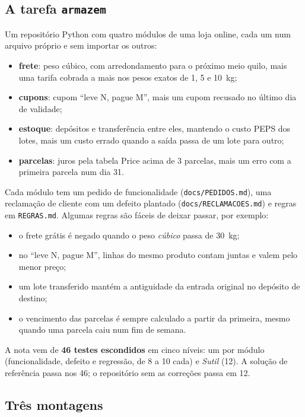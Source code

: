 \documentclass[11pt,a4paper]{article}
\begin{document}
\subsection{A tarefa \texttt{armazem}}

Um repositório Python com quatro módulos de uma loja online, cada um num arquivo próprio e sem
importar os outros:
\begin{itemize}
  \item \textbf{frete}: peso cúbico, com arredondamento para o próximo meio quilo, mais uma tarifa cobrada a mais nos pesos exatos de 1, 5 e 10~kg;
  \item \textbf{cupons}: cupom ``leve N, pague M'', mais um cupom recusado no último dia de validade;
  \item \textbf{estoque}: depósitos e transferência entre eles, mantendo o custo PEPS dos lotes, mais um custo errado quando a saída passa de um lote para outro;
  \item \textbf{parcelas}: juros pela tabela Price acima de 3 parcelas, mais um erro com a primeira parcela num dia 31.
\end{itemize}
Cada módulo tem um pedido de funcionalidade (\texttt{docs/PEDIDOS.md}), uma reclamação de cliente com
um defeito plantado (\texttt{docs/RECLAMACOES.md}) e regras em \texttt{REGRAS.md}. Algumas regras são
fáceis de deixar passar, por exemplo:
\begin{itemize}
  \item o frete grátis é negado quando o peso \emph{cúbico} passa de 30~kg;
  \item no ``leve N, pague M'', linhas do mesmo produto contam juntas e valem pelo menor preço;
  \item um lote transferido mantém a antiguidade da entrada original no depósito de destino;
  \item o vencimento das parcelas é sempre calculado a partir da primeira, mesmo quando uma parcela
    caiu num fim de semana.
\end{itemize}

A nota vem de \textbf{46 testes escondidos} em cinco níveis: um por módulo (funcionalidade, defeito e
regressão, de 8 a 10 cada) e \emph{Sutil} (12). A solução de referência passa nos 46; o repositório
sem as correções passa em 12.

\subsection{Três montagens}
\end{document}

